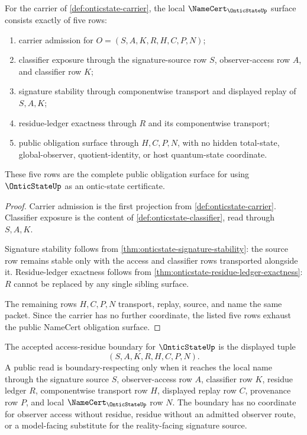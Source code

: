 \begin{theorem}
\label{thm:onticstate-namecert-obligation-surface}
For the carrier of \autoref{def:onticstate-carrier}, the local $\NameCert_{\OnticStateUp}$ surface consists exactly of five rows:
\begin{enumerate}
\item carrier admission for $O=(S,A,K,R,H,C,P,N)$;
\item classifier exposure through the signature-source row $S$, observer-access row $A$, and classifier row $K$;
\item signature stability through componentwise transport and displayed replay of $S,A,K$;
\item residue-ledger exactness through $R$ and its componentwise transport;
\item public obligation surface through $H,C,P,N$, with no hidden total-state, global-observer, quotient-identity, or host quantum-state coordinate.
\end{enumerate}
These five rows are the complete public obligation surface for using $\OnticStateUp$ as an ontic-state certificate.
\end{theorem}
\begin{proof}
Carrier admission is the first projection from \autoref{def:onticstate-carrier}. Classifier exposure is the content of \autoref{def:onticstate-classifier}, read through $S,A,K$.

Signature stability follows from \autoref{thm:onticstate-signature-stability}: the source row remains stable only with the access and classifier rows transported alongside it. Residue-ledger exactness follows from \autoref{thm:onticstate-residue-ledger-exactness}: $R$ cannot be replaced by any single sibling surface.

The remaining rows $H,C,P,N$ transport, replay, source, and name the same packet. Since the carrier has no further coordinate, the listed five rows exhaust the public NameCert obligation surface.
\end{proof}

\begin{definition}
\label{def:onticstate-access-residue-boundary}
The accepted access-residue boundary for $\OnticStateUp$ is the displayed tuple
$$
(S,A,K,R,H,C,P,N).
$$
A public read is boundary-respecting only when it reaches the local name through the signature source $S$, observer-access row $A$, classifier row $K$, residue ledger $R$, componentwise transport row $H$, displayed replay row $C$, provenance row $P$, and local $\NameCert_{\OnticStateUp}$ row $N$. The boundary has no coordinate for observer access without residue, residue without an admitted observer route, or a model-facing substitute for the reality-facing signature source.
\end{definition}

